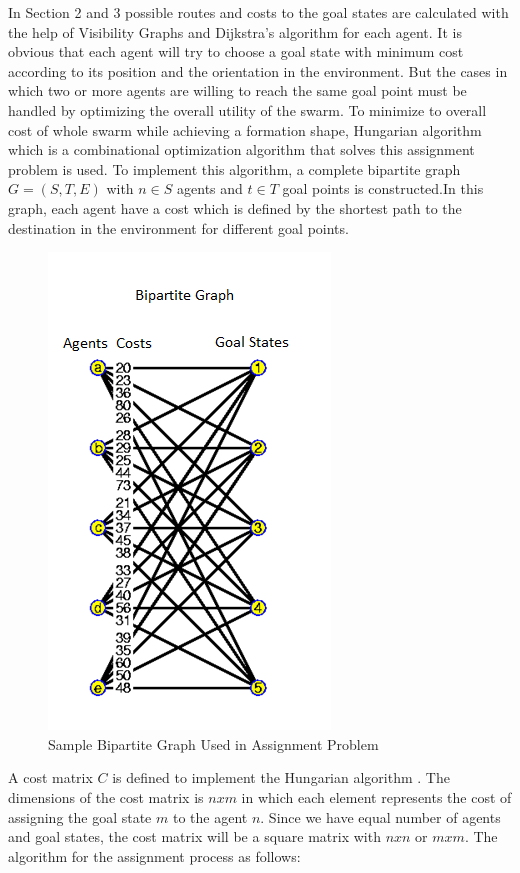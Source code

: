 \documentclass[twoside]{article}
\begin{document}
In Section 2 and 3 possible routes and costs to the goal states are calculated with the help of Visibility Graphs and Dijkstra's algorithm  for each agent. It is obvious that each agent will try to choose a goal state with minimum cost according to its position and the orientation in the environment. But the cases in which two or more agents are willing to reach the same goal point must be handled by optimizing the overall utility of the swarm. To minimize to overall cost of whole swarm while achieving a formation shape, Hungarian algorithm which is a combinational optimization algorithm that solves this assignment problem is used. To implement this algorithm, a complete bipartite graph $G=(S,T,E)$ with $n \in S$ agents and $t \in T$ goal points is constructed.In this graph, each agent have a cost which is defined by the shortest path to the destination in the environment for different goal points. 
	\begin{figure}[H]
		\includegraphics[width=.4\textwidth,center]{bipartite}
		\caption{Sample Bipartite Graph Used in Assignment Problem}
	\end{figure}

	A cost matrix  $C$ is defined to implement the Hungarian algorithm .  The dimensions of the cost matrix is $nxm$ in which each element represents the cost of assigning the goal state $m$ to the agent $n$.  Since we have equal number of agents and goal states, the cost matrix will be a square matrix with $nxn$ or $mxm$.  The algorithm for the assignment process as follows:
	
	
	
\end{document}
